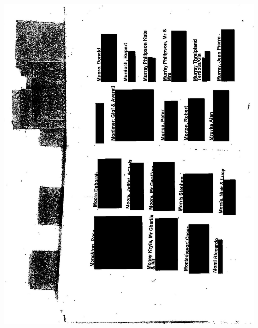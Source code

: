 \documentclass[10pt]{article}
\begin{document}
\includegraphics[max width=\textwidth, center]{2025_02_27_dd68c3d38de88f0516d9g-161(1)}
\end{document}
